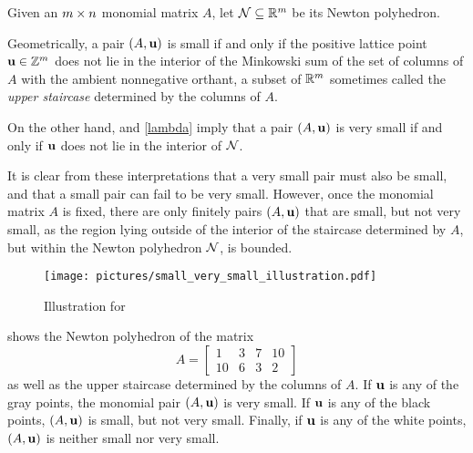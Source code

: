 \documentclass[11pt]{amsart}
\begin{document}
\begin{remark}
\label{geometric small and very small: R}
Given an $m \times n$ monomial matrix $A$, let $\mathcal{N} \subseteq \mathbb{R}^{m}$ be its Newton polyhedron.

Geometrically, a pair $(A, \mathbf{u})$ is small if and only if the positive lattice point $\mathbf{u} \in \mathbb{Z}^{m}$ does not lie in the interior of the Minkowski sum of the set of columns of $A$ with the ambient nonnegative orthant, a subset of $\mathbb{R}^{m}$ sometimes called the \emph{upper staircase} determined by the columns of $A$. 

On the other hand,  and \eqref{lambda} imply that a pair $(A, \mathbf{u})$ is very small if and only if $\mathbf{u}$ does not lie in the interior of $\mathcal{N}$.

It is clear from these interpretations that a very small pair must also be small, and that a small pair can fail to be very small.  However, once the monomial matrix $A$ is fixed, there are only finitely pairs $(A, \mathbf{u})$ that are small, but not very small, as the region lying outside of the interior of the staircase determined by $A$, but within the Newton polyhedron $\mathcal{N}$, is bounded.%
\end{remark}

\begin{example}
   \label{ex: small vs very small}
   \begin{figure}
      \centering
      \texttt{[image: pictures/small\_very\_small\_illustration.pdf]}
      \caption{Illustration for }
      \label{fig: small vs very small}
   \end{figure}
    shows the Newton polyhedron of the matrix
   \[A=
      \begin{bmatrix}
         1&3&7&10\\
         10&6&3&2
      \end{bmatrix}
   \]
   as well as the upper staircase determined by the columns of $A$.
   If $\mathbf{u}$ is any of the gray points, the monomial pair $(A,\mathbf{u})$ is very small.
   If $\mathbf{u}$ is any of the black points, $(A,\mathbf{u})$ is small, but not very small.
   Finally, if $\mathbf{u}$ is any of the white points, $(A,\mathbf{u})$ is neither small nor very small.
\end{example}
\end{document}
